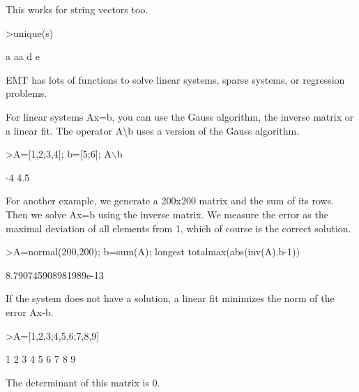 \documentclass{article}
\begin{document}
\begin{eulernotebook}
\begin{eulercomment}
\begin{eulercomment}
\begin{eulercomment}
\begin{eulercomment}
\begin{eulercomment}
\begin{eulercomment}
\begin{eulercomment}
This works for string vectors too.
\end{eulercomment}
\begin{eulerprompt}
>unique(s)
\end{eulerprompt}
\begin{euleroutput}
  a
  aa
  d
  e
\end{euleroutput}
\begin{eulercomment}
EMT has lots of functions to solve linear systems, sparse systems, or
regression problems.

For linear systems Ax=b, you can use the Gauss algorithm, the inverse matrix
or a linear fit. The operator A\textbackslash{}b uses a version of the Gauss algorithm.
\end{eulercomment}
\begin{eulerprompt}
>A=[1,2;3,4]; b=[5;6]; A\(\backslash\)b
\end{eulerprompt}
\begin{euleroutput}
             -4 
            4.5 
\end{euleroutput}
\begin{eulercomment}
For another example, we generate a 200x200 matrix and the sum of its rows.
Then we solve Ax=b using the inverse matrix. We measure the error as the
maximal deviation of all elements from 1, which of course is the correct
solution.
\end{eulercomment}
\begin{eulerprompt}
>A=normal(200,200); b=sum(A); longest totalmax(abs(inv(A).b-1))
\end{eulerprompt}
\begin{euleroutput}
    8.790745908981989e-13 
\end{euleroutput}
\begin{eulercomment}
If the system does not have a solution, a linear fit minimizes the norm of
the error Ax-b.
\end{eulercomment}
\begin{eulerprompt}
>A=[1,2,3;4,5,6;7,8,9]
\end{eulerprompt}
\begin{euleroutput}
              1             2             3 
              4             5             6 
              7             8             9 
\end{euleroutput}
\begin{eulercomment}
The determinant of this matrix is 0.
\end{eulercomment}
\begin{eulerprompt}

\end{eulerprompt}
\end{eulercomment}
\end{eulercomment}
\end{eulercomment}
\end{eulercomment}
\end{eulercomment}
\end{eulercomment}
\end{eulernotebook}
\end{document}
